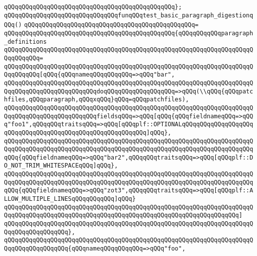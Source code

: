 \verb|qQQqqQQqqQQqqQQqqQQqqQQqqQQqqQQqqQQqqQQqqQQqqQQq};|\newline
\newline
\verb|qQQqqQQqqQQqqQQqqQQqqQQqqQQqqQQqfunqQQqtest_basic_paragraph_digestionqQQq()|\newline
\verb|qQQqqQQqqQQqqQQqqQQqqQQqqQQqqQQqqQQqqQQqqQQqqQQq=|\newline
\verb|qQQqqQQqqQQqqQQqqQQqqQQqqQQqqQQqqQQqqQQqqQQqqQQq{qQQqqQQqqQQqparagraph_definitions|\newline
\verb|qQQqqQQqqQQqqQQqqQQqqQQqqQQqqQQqqQQqqQQqqQQqqQQqqQQqqQQqqQQqqQQqqQQqqQQqqQQqqQQq=|\newline
\verb|qQQqqQQqqQQqqQQqqQQqqQQqqQQqqQQqqQQqqQQqqQQqqQQqqQQqqQQqqQQqqQQqqQQqqQQqqQQqqQQq[qQQq{qQQqnameqQQqqQQqqQQq=>qQQq"bar",|\newline
\verb|qQQqqQQqqQQqqQQqqQQqqQQqqQQqqQQqqQQqqQQqqQQqqQQqqQQqqQQqqQQqqQQqqQQqqQQqqQQqqQQqqQQqqQQqqQQqqQQqdoqQQqqQQqqQQqqQQqqQQq=>qQQq(\\qQQq{qQQqpatchfiles,qQQqparagraph,qQQqxqQQq}qQQq=qQQqpatchfiles),|\newline
\verb|qQQqqQQqqQQqqQQqqQQqqQQqqQQqqQQqqQQqqQQqqQQqqQQqqQQqqQQqqQQqqQQqqQQqqQQqqQQqqQQqqQQqqQQqqQQqqQQqfieldsqQQq=>qQQq[qQQq{qQQqfieldnameqQQq=>qQQq"foo1",qQQqqQQqtraitsqQQq=>qQQq[qQQqplf::OPTIONALqQQqqQQqqQQqqQQqqQQqqQQqqQQqqQQqqQQqqQQqqQQqqQQqqQQqqQQqqQQq]qQQq},|\newline
\verb|qQQqqQQqqQQqqQQqqQQqqQQqqQQqqQQqqQQqqQQqqQQqqQQqqQQqqQQqqQQqqQQqqQQqqQQqqQQqqQQqqQQqqQQqqQQqqQQqqQQqqQQqqQQqqQQqqQQqqQQqqQQqqQQqqQQqqQQqqQQqqQQq{qQQqfieldnameqQQq=>qQQq"bar2",qQQqqQQqtraitsqQQq=>qQQq[qQQqplf::DO_NOT_TRIM_WHITESPACEqQQq]qQQq},|\newline
\verb|qQQqqQQqqQQqqQQqqQQqqQQqqQQqqQQqqQQqqQQqqQQqqQQqqQQqqQQqqQQqqQQqqQQqqQQqqQQqqQQqqQQqqQQqqQQqqQQqqQQqqQQqqQQqqQQqqQQqqQQqqQQqqQQqqQQqqQQqqQQqqQQq{qQQqfieldnameqQQq=>qQQq"zot3",qQQqqQQqtraitsqQQq=>qQQq[qQQqplf::ALLOW_MULTIPLE_LINESqQQqqQQqqQQq]qQQq}|\newline
\verb|qQQqqQQqqQQqqQQqqQQqqQQqqQQqqQQqqQQqqQQqqQQqqQQqqQQqqQQqqQQqqQQqqQQqqQQqqQQqqQQqqQQqqQQqqQQqqQQqqQQqqQQqqQQqqQQqqQQqqQQqqQQqqQQqqQQqqQQq]|\newline
\verb|qQQqqQQqqQQqqQQqqQQqqQQqqQQqqQQqqQQqqQQqqQQqqQQqqQQqqQQqqQQqqQQqqQQqqQQqqQQqqQQqqQQqqQQq},|\newline
\newline
\verb|qQQqqQQqqQQqqQQqqQQqqQQqqQQqqQQqqQQqqQQqqQQqqQQqqQQqqQQqqQQqqQQqqQQqqQQqqQQqqQQqqQQqqQQq{qQQqnameqQQqqQQqqQQq=>qQQq"foo",|\newline
